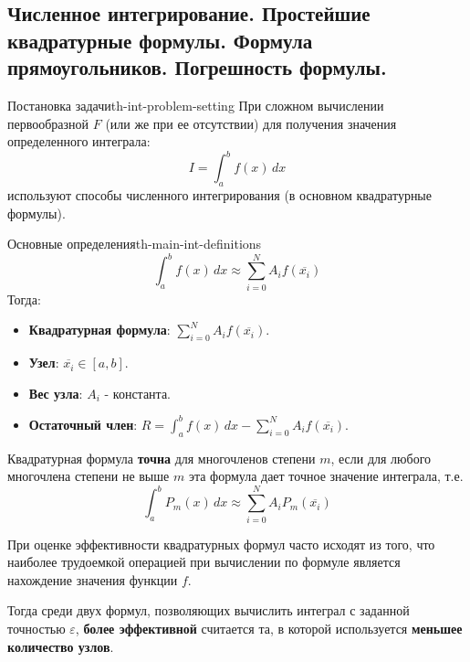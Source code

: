 \documentclass[14pt]{extarticle}
\begin{document}
\clearpage
\subsection{Численное интегрирование. Простейшие квадратурные формулы. Формула прямоугольников. Погрешность формулы.}

    \begin{theorem}{Постановка задачи}{th-int-problem-setting}
        При сложном вычислении первообразной $F$ (или же при ее отсутствии) для получения значения определенного интеграла: 
        $$I = \int_{a}^{b} f(x) \, dx$$
        используют способы численного интегрирования (в основном квадратурные формулы).
    \end{theorem}

    \begin{definition}{Основные определения}{th-main-int-definitions}
        $$\int_{a}^{b} f(x) \, dx \approx \sum_{i = 0}^{N} A_{i}f(\overline{x_{i}})$$
        Тогда:
        \begin{itemize}
            \item \textbf{Квадратурная формула}: $\sum_{i = 0}^{N} A_{i}f(\overline{x_{i}})$.
            \item \textbf{Узел}: $\overline{x_{i}} \in [a, b]$.
            \item \textbf{Вес узла}: $A_{i}$ - константа.
            \item \textbf{Остаточный член}: $R = \int_{a}^{b} f(x) \, dx - \sum_{i = 0}^{N} A_{i} f(\overline{x_{i}})$.
        \end{itemize}

        \vspace{\baselineskip}

        Квадратурная формула \textbf{точна} для многочленов степени $m$, если для любого многочлена степени не выше $m$ эта формула дает точное значение интеграла, т.е.
        $$\int_{a}^{b} P_{m}(x) \, dx \approx \sum_{i = 0}^{N} A_{i}P_{m}(\overline{x_{i}})$$
    
        \vspace{\baselineskip}
    
        При оценке эффективности квадратурных формул часто исходят из того, что наиболее трудоемкой операцией при вычислении по формуле является нахождение значения функции $f$. 
        
        \vspace{\baselineskip}
        
        Тогда среди двух формул, позволяющих вычислить интеграл с заданной точностью $\varepsilon$, \textbf{более эффективной} считается та, в которой используется \textbf{меньшее количество узлов}.


\end{definition}
\end{document}
